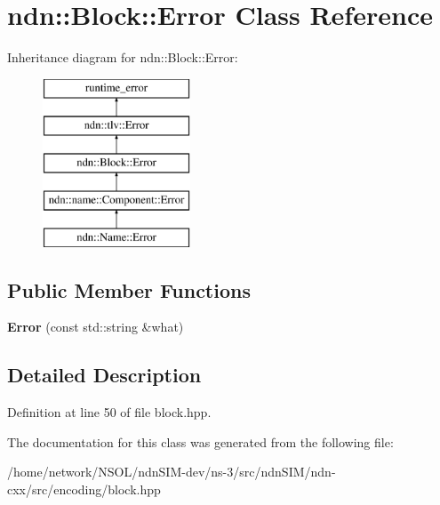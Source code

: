 \hypertarget{classndn_1_1Block_1_1Error}{}\section{ndn\+:\+:Block\+:\+:Error Class Reference}
\label{classndn_1_1Block_1_1Error}
Inheritance diagram for ndn\+:\+:Block\+:\+:Error\+:\begin{figure}[H]
\begin{center}
\leavevmode
\includegraphics[height=5.000000cm]{classndn_1_1Block_1_1Error}
\end{center}
\end{figure}
\subsection*{Public Member Functions}
\begin{DoxyCompactItemize}
\item 
{\bfseries Error} (const std\+::string \&what)\hypertarget{classndn_1_1Block_1_1Error_a77ce587057d17a0fd5b4d532caa9f311}{}\label{classndn_1_1Block_1_1Error_a77ce587057d17a0fd5b4d532caa9f311}

\end{DoxyCompactItemize}


\subsection{Detailed Description}


Definition at line 50 of file block.\+hpp.



The documentation for this class was generated from the following file\+:\begin{DoxyCompactItemize}
\item 
/home/network/\+N\+S\+O\+L/ndn\+S\+I\+M-\/dev/ns-\/3/src/ndn\+S\+I\+M/ndn-\/cxx/src/encoding/block.\+hpp\end{DoxyCompactItemize}
